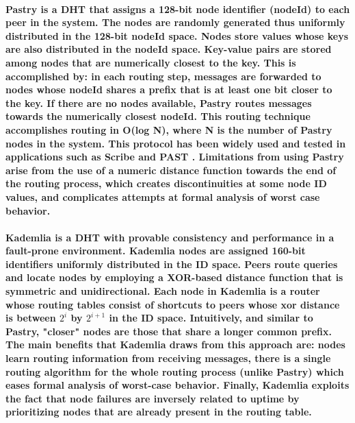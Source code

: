 \paragraph{ \textbf{Pastry} \cite{rowstron2001pastry} is a DHT that assigns a 128-bit node identifier (nodeId) to each peer in the system. The nodes are randomly generated thus uniformly distributed in the 128-bit nodeId space. Nodes store values whose keys are also distributed in the nodeId space. Key-value pairs are stored among nodes that are numerically closest to the key. This is accomplished by: in each routing step, messages are forwarded to nodes whose nodeId shares a prefix that is at least one bit closer to the key. If there are no nodes available, Pastry routes messages towards the numerically closest nodeId. This routing technique accomplishes routing in O(log N), where N is the number of Pastry nodes in the system. This protocol has been widely used and tested in applications such as Scribe \cite{10.1007/3-540-45546-9_3} and PAST \cite{990064}. Limitations from using Pastry arise from the use of a numeric distance function towards the end of the routing process, which creates discontinuities at some node ID values, and complicates attempts at formal analysis of worst case behavior. }

\paragraph{ \textbf{Kademlia} \cite{10.1007/3-540-45748-8_5} is a DHT with provable consistency and performance in a fault-prone environment. Kademlia nodes are assigned 160-bit identifiers uniformly distributed in the ID space. Peers route queries and locate nodes by employing a XOR-based distance function that is symmetric and unidirectional. Each node in Kademlia is a router whose routing tables consist of shortcuts to peers whose \textbf{xor distance} is between \(2^{i}\) by \(2^{i + 1}\) in the ID space. Intuitively, and similar to Pastry, "closer" nodes are those that share a longer common prefix. The main benefits that Kademlia draws from this approach are: nodes learn routing information from receiving messages, there is a single routing algorithm for the whole routing process (unlike Pastry) which eases formal analysis of worst-case behavior. Finally, Kademlia exploits the fact that node failures are inversely related to uptime by prioritizing nodes that are already present in the routing table. }

